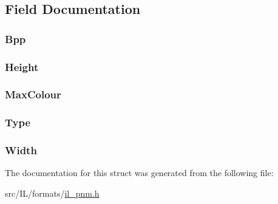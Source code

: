 \subsection{Field Documentation}
\hypertarget{struct_p_p_m_i_n_f_o_acb619433784a0e26c0f1f18b3700c9f7}{
\subsubsection[{Bpp}]{ Bpp}}\label{struct_p_p_m_i_n_f_o_acb619433784a0e26c0f1f18b3700c9f7}
\hypertarget{struct_p_p_m_i_n_f_o_a8a8093d76b61a95fc96df24af29b107a}{
\subsubsection[{Height}]{ Height}}\label{struct_p_p_m_i_n_f_o_a8a8093d76b61a95fc96df24af29b107a}
\hypertarget{struct_p_p_m_i_n_f_o_aa49730f5f130f2f7d5c08991f5b77472}{
\subsubsection[{Max\-Colour}]{ Max\-Colour}}\label{struct_p_p_m_i_n_f_o_aa49730f5f130f2f7d5c08991f5b77472}
\hypertarget{struct_p_p_m_i_n_f_o_a437e4fc3b579e2e7879dedd0fd2ac587}{
\subsubsection[{Type}]{ Type}}\label{struct_p_p_m_i_n_f_o_a437e4fc3b579e2e7879dedd0fd2ac587}
\hypertarget{struct_p_p_m_i_n_f_o_a4146e7b2b0b4097e0e335f9b348392bf}{
\subsubsection[{Width}]{ Width}}\label{struct_p_p_m_i_n_f_o_a4146e7b2b0b4097e0e335f9b348392bf}


The documentation for this struct was generated from the following file\-:\begin{DoxyCompactItemize}
\item 
src/\-I\-L/formats/\hyperlink{il__pnm_8h}{il\-\_\-pnm.\-h}\end{DoxyCompactItemize}
